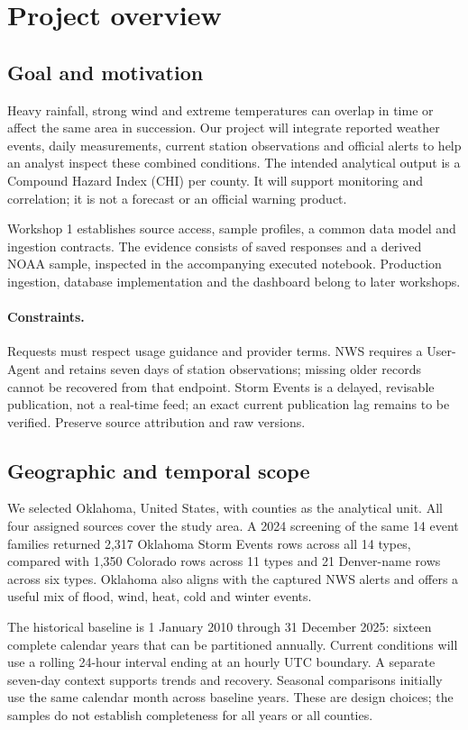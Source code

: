 \section{Project overview}
\subsection{Goal and motivation}
Heavy rainfall, strong wind and extreme temperatures can overlap in time or
affect the same area in succession. Our project will integrate reported weather
events, daily measurements, current station observations and official alerts to
help an analyst inspect these combined conditions. The intended analytical output
is a Compound Hazard Index (CHI) per county. It will support monitoring and
correlation; it is not a forecast or an official warning product.

Workshop 1 establishes source access, sample profiles, a common data model and
ingestion contracts. The evidence consists of saved responses and a derived NOAA
sample, inspected in the accompanying executed notebook. Production ingestion,
database implementation and the dashboard belong to later workshops.

\paragraph{Constraints.} Requests must respect usage guidance and provider
terms. NWS requires a User-Agent and retains seven days of station observations;
missing older records cannot be recovered from that endpoint. Storm Events is a
delayed, revisable publication, not a real-time feed; an exact current publication
lag remains to be verified. Preserve source attribution and raw versions.

\subsection{Geographic and temporal scope}
We selected Oklahoma, United States, with counties as the analytical unit.
All four assigned sources cover the study area. A 2024 screening of the same
14 event families returned 2,317 Oklahoma Storm Events rows across all 14 types,
compared with 1,350 Colorado rows across 11 types and 21 Denver-name rows across
six types. Oklahoma also aligns with the captured NWS alerts and offers a useful
mix of flood, wind, heat, cold and winter events.

The historical baseline is 1 January 2010 through 31 December 2025: sixteen
complete calendar years that can be partitioned annually. Current conditions
will use a rolling 24-hour interval ending at an hourly UTC boundary. A separate
seven-day context supports trends and recovery. Seasonal comparisons initially
use the same calendar month across baseline years. These are design choices;
the samples do not establish completeness for all years or all counties.

